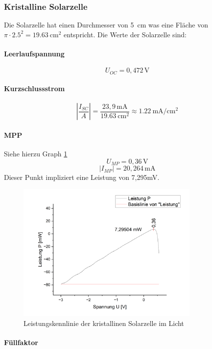 \documentclass[12pt,a4paper,ngerman]{report}
\begin{document}
		
		\subsubsection{Kristalline Solarzelle}
		Die Solarzelle hat einen Durchmesser von \qty{5}{\centi\m} was eine Fläche von $\pi\cdot\num{2,5}^2=\qty{19,63}{\centi\m^2}$ entspricht. Die Werte der Solarzelle sind:
		
		\paragraph{Leerlaufspannung}
		$$
			U_{OC} = 0,472\, \text{V}
		$$
		
		\paragraph{Kurzschlussstrom}
		$$\left|\frac{I_{SC}}{A}\right|=\frac{23,9\,\text{mA}}{\qty{19,63}{\centi\square\metre}}\approx\qty{1,22}{\milli\ampere\per\centi\square\metre} $$
		
		\paragraph{MPP} Siehe hierzu Graph \ref{fig:Leistkrishell}
		$$U_{MP}=0,36\,\text{V}$$ $$\vert I_{MP}\vert=20,264\,\text{mA}$$ 
		Dieser Punkt impliziert eine Leistung von 7,295mV.

		\begin{figure}
			\centering
			\includegraphics[width=0.8\textwidth]{Origin/LeistungKristall.png}
			\caption{Leistungskennlinie der kristallinen Solarzelle im Licht}
			\label{fig:Leistkrishell}
		\end{figure}
		
		\paragraph{Füllfaktor}
		
\end{document}
